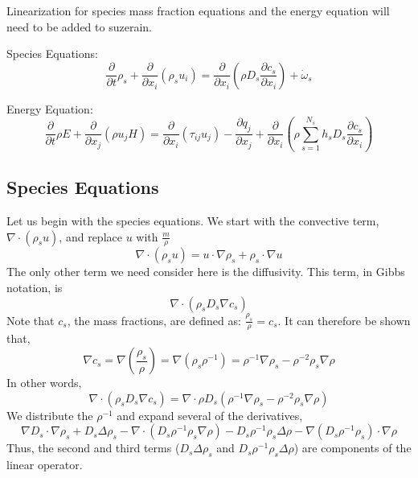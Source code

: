 \documentclass[10pt]{article}
\newcommand{\myred}[1]{{\color{red} #1}}
\begin{document}
Linearization for species mass fraction equations and the
energy equation will need to be added to suzerain. 

Species Equations:
\begin{equation}
 \frac{\partial}{\partial t} \rho_s + \frac{\partial}{\partial
  x_i}\left(\rho_s u_i\right) = \frac{\partial}{\partial x_i}\left(\rho D_s
  \frac{\partial c_s}{\partial x_i} \right) + \dot \omega_s
\end{equation}

Energy Equation:
\begin{equation}
\frac{\partial}{\partial t} \rho E + \frac{\partial }{\partial x_j}\left(\rho
u_j H\right) = \frac{\partial }{\partial x_i}\left(\tau_{ij}u_j\right) - \frac{\partial q_j
}{\partial x_j} + \frac{\partial }{\partial x_i}\left(\rho \sum^{N_s}_{s=1}
h_s D_s \frac{\partial c_s}{\partial x_i} \right)
\end{equation}



%
%
%
\subsection{Species Equations}
Let us begin with the species equations. We start with the convective
term, $\nabla \cdot (\rho_s u)$, and replace $u$ with $\frac{m}{\rho}$
\begin{equation}
  \nabla \cdot (\rho_s u) = u \cdot \nabla \rho_s + \rho_s \cdot \nabla
   u 
\end{equation}
\newline
\newline
The only other term we need consider here is 
the diffusivity. This term, in Gibbs notation, is
\begin{equation}
  \nabla \cdot (\rho_s D_s \nabla c_s)
\end{equation}
Note that $c_s$, the mass fractions, are defined as:
$\frac{\rho_s}{\rho} = 
c_s$.  It can therefore be shown that,
\begin{equation}
  \nabla c_s = \nabla (\frac{\rho_s}{\rho}) = \nabla (\rho_s \rho^{-1})
             = \rho^{-1} \nabla \rho_s - \rho^{-2} \rho_s \nabla \rho
\end{equation}
In other words,
\begin{equation}
  \label{eq:speciesdiffexpansion}
  \nabla \cdot (\rho_s D_s \nabla c_s) = \nabla \cdot \rho D_s (\rho^{-1} \nabla \rho_s - \rho^{-2} \rho_s \nabla \rho)
\end{equation}
We distribute the $\rho^{-1}$ and expand several of the derivatives,
\begin{equation}
  \nabla D_s \cdot \nabla \rho_s + D_s \Delta \rho_s - \nabla \cdot (D_s \rho^{-1} \rho_s \nabla \rho) - D_s \rho^{-1} \rho_s \Delta \rho - \nabla(D_s \rho^{-1} \rho_s) \cdot \nabla \rho
\end{equation}
Thus, the second and third terms ($D_s \Delta \rho_s$ and $D_s \rho^{-1}
\rho_s \Delta \rho$) are components of the linear operator. 
\end{document}
